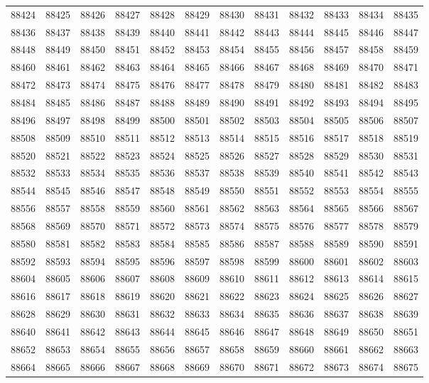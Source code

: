 \begin{center}
\begin{longtable}{llllllllllll}
88424 &88425 &88426 &88427 &88428 &88429 &88430 &88431 &88432 &88433 &88434 &88435 \\
88436 &88437 &88438 &88439 &88440 &88441 &88442 &88443 &88444 &88445 &88446 &88447 \\
88448 &88449 &88450 &88451 &88452 &88453 &88454 &88455 &88456 &88457 &88458 &88459 \\
88460 &88461 &88462 &88463 &88464 &88465 &88466 &88467 &88468 &88469 &88470 &88471 \\
88472 &88473 &88474 &88475 &88476 &88477 &88478 &88479 &88480 &88481 &88482 &88483 \\
88484 &88485 &88486 &88487 &88488 &88489 &88490 &88491 &88492 &88493 &88494 &88495 \\
88496 &88497 &88498 &88499 &88500 &88501 &88502 &88503 &88504 &88505 &88506 &88507 \\
88508 &88509 &88510 &88511 &88512 &88513 &88514 &88515 &88516 &88517 &88518 &88519 \\
88520 &88521 &88522 &88523 &88524 &88525 &88526 &88527 &88528 &88529 &88530 &88531 \\
88532 &88533 &88534 &88535 &88536 &88537 &88538 &88539 &88540 &88541 &88542 &88543 \\
88544 &88545 &88546 &88547 &88548 &88549 &88550 &88551 &88552 &88553 &88554 &88555 \\
88556 &88557 &88558 &88559 &88560 &88561 &88562 &88563 &88564 &88565 &88566 &88567 \\
88568 &88569 &88570 &88571 &88572 &88573 &88574 &88575 &88576 &88577 &88578 &88579 \\
88580 &88581 &88582 &88583 &88584 &88585 &88586 &88587 &88588 &88589 &88590 &88591 \\
88592 &88593 &88594 &88595 &88596 &88597 &88598 &88599 &88600 &88601 &88602 &88603 \\
88604 &88605 &88606 &88607 &88608 &88609 &88610 &88611 &88612 &88613 &88614 &88615 \\
88616 &88617 &88618 &88619 &88620 &88621 &88622 &88623 &88624 &88625 &88626 &88627 \\
88628 &88629 &88630 &88631 &88632 &88633 &88634 &88635 &88636 &88637 &88638 &88639 \\
88640 &88641 &88642 &88643 &88644 &88645 &88646 &88647 &88648 &88649 &88650 &88651 \\
88652 &88653 &88654 &88655 &88656 &88657 &88658 &88659 &88660 &88661 &88662 &88663 \\
88664 &88665 &88666 &88667 &88668 &88669 &88670 &88671 &88672 &88673 &88674 &88675 \\

\end{longtable}
\end{center}
